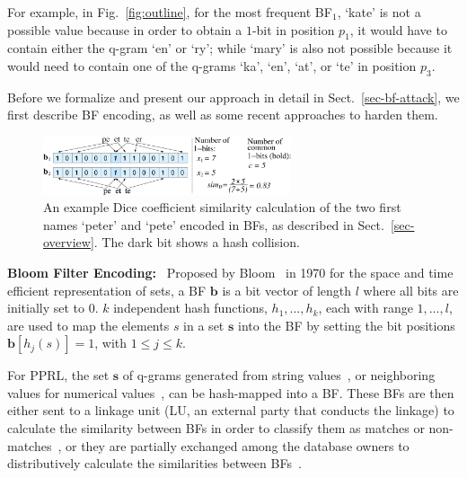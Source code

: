 \documentclass{llncs}
\begin{document}
For example, in Fig.~\ref{fig:outline}, for the most frequent BF$_1$,
`kate' is not a possible value because in order to obtain a $1$-bit
in position $p_1$, it would have to contain either the q-gram `en'
or `ry'; while `mary' is also not possible because it would need to
contain one of the q-grams `ka', `en', `at', or `te' in position
$p_3$.

Before we formalize and present our approach in detail in
Sect.~\ref{sec-bf-attack}, we first describe BF encoding, as well as
some recent approaches to harden them.


\smallskip


\begin{figure}[!t]
  \centering
  \includegraphics[width=0.65\textwidth]{bloomfilter}
  \caption{An example Dice coefficient similarity calculation of the
           two first names `peter' and `pete'  encoded in BFs, as
           described in Sect.~\ref{sec-overview}. The dark bit shows
           a hash collision.}
           \label{fig:bloomfilter}
\end{figure}

\textbf{Bloom Filter Encoding:}~
Proposed by Bloom~\cite{Blo70} in 1970 for the space and time
efficient representation of sets, a BF $\mathbf{b}$ is a bit vector
of length $l$ where all bits are initially set to $0$. $k$
independent hash functions, $h_1, \ldots, h_k$, each with range
$1, \ldots, l$, are used to map the elements $s$ in a set
$\mathbf{s}$ into the BF by setting the bit positions
$\mathbf{b}[h_j(s)]=1$, with $1 \le j \le k$.

For PPRL, the set $\mathbf{s}$ of q-grams generated from string
values~\cite{Sch09}, or neighboring values for numerical
values~\cite{Vat16}, can be hash-mapped into a BF. These BFs are then
either sent to a linkage unit (LU, an external party that conducts
the linkage) to calculate the similarity between BFs in order to
classify them as matches or non-matches~\cite{Sch09}, or they are
partially exchanged among the database owners to distributively
calculate the similarities between BFs~\cite{Vat14c}.
\end{document}
